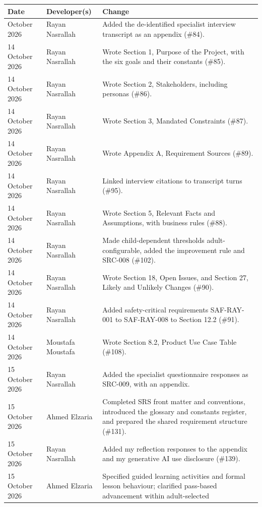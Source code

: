 \documentclass[12pt]{article}
\renewcommand{\_}{\textunderscore\allowbreak}%
\begin{document}
\begin{longtable}{@{}p{3cm}p{3cm}>{\raggedright\arraybackslash}p{\dimexpr\textwidth-6cm-4\tabcolsep\relax}@{}}
\toprule {\textbf{Date}} & {\textbf{Developer(s)}} & {\textbf{Change}}\\
\midrule
\endhead
\bottomrule
\endlastfoot
13 October 2026 & Rayan Nasrallah & Added the de-identified specialist interview
transcript as an appendix (\#84).\\
14 October 2026 & Rayan Nasrallah & Wrote Section 1, Purpose of the Project,
with the six goals and their constants (\#85).\\
14 October 2026 & Rayan Nasrallah & Wrote Section 2, Stakeholders, including
personas (\#86).\\
14 October 2026 & Rayan Nasrallah & Wrote Section 3, Mandated Constraints
(\#87).\\
14 October 2026 & Rayan Nasrallah & Wrote Appendix A, Requirement Sources
(\#89).\\
14 October 2026 & Rayan Nasrallah & Linked interview citations to transcript
turns (\#95).\\
14 October 2026 & Rayan Nasrallah & Wrote Section 5, Relevant Facts and
Assumptions, with business rules (\#88).\\
14 October 2026 & Rayan Nasrallah & Made child-dependent thresholds
adult-configurable, added the improvement rule and SRC-008 (\#102).\\
14 October 2026 & Rayan Nasrallah & Wrote Section 18, Open Issues, and Section
27, Likely and Unlikely Changes (\#90).\\
14 October 2026 & Rayan Nasrallah & Added safety-critical requirements
SAF-RAY-001 to SAF-RAY-008 to Section 12.2 (\#91).\\
14 October 2026 & Moustafa Moustafa & Wrote Section 8.2, Product Use Case Table
(\#108).\\
15 October 2026 & Rayan Nasrallah & Added the specialist questionnaire responses
as SRC-009, with an appendix.\\
15 October 2026 & Ahmed Elzaria & Completed SRS front matter and conventions,
introduced the glossary and constants register, and prepared the shared
requirement structure (\#131).\\
15 October 2026 & Rayan Nasrallah & Added my reflection responses to the
appendix and my generative AI use disclosure (\#139).\\
15 October 2026 & Ahmed Elzaria & Specified guided learning activities and
formal lesson behaviour; clarified pass-based advancement within adult-selected

\end{longtable}
\end{document}
